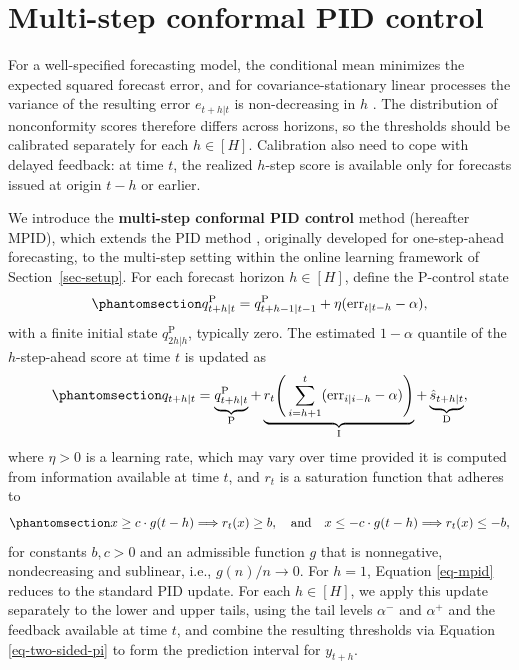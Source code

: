 \documentclass[
  american,
  12pt]{article}
\theoremstyle{plain}
\theoremstyle{plain}
\theoremstyle{remark}
\begin{document}
\section{Multi-step conformal PID control}\label{sec-mpid}

For a well-specified forecasting model, the conditional mean minimizes
the expected squared forecast error, and for covariance-stationary
linear processes the variance of the resulting error \(e_{t+h|t}\) is
non-decreasing in \(h\) \citep{diebold1996, patton2007}. The
distribution of nonconformity scores therefore differs across horizons,
so the thresholds should be calibrated separately for each \(h\in[H]\).
Calibration also need to cope with delayed feedback: at time \(t\), the
realized \(h\)-step score is available only for forecasts issued at
origin \(t-h\) or earlier.

We introduce the \textbf{multi-step conformal PID control} method
(hereafter MPID), which extends the PID method \citep{angelopoulos2024},
originally developed for one-step-ahead forecasting, to the multi-step
setting within the online learning framework of Section~\ref{sec-setup}.
For each forecast horizon \(h\in[H]\), define the P-control state
\begin{equation}\phantomsection\label{eq-p-state}{
q^{\mathrm P}_{t+h|t}=q^{\mathrm P}_{t+h-1|t-1}+\eta(\mathrm{err}_{t|t-h}-\alpha),
}\end{equation} with a finite initial state \(q^{\mathrm P}_{2h|h}\),
typically zero. The estimated \(1-\alpha\) quantile of the
\(h\)-step-ahead score at time \(t\) is updated as
\begin{equation}\phantomsection\label{eq-mpid}{
q_{t+h|t}=\underbrace{q^{\mathrm P}_{t+h|t}}_{\mathrm P}+\underbrace{r_t\Bigg(\sum_{i=h+1}^t(\mathrm{err}_{i|i-h}-\alpha)\Bigg)}_{\mathrm I}+\underbrace{\hat{s}_{t+h|t}}_{\mathrm D},
}\end{equation} where \(\eta > 0\) is a learning rate, which may vary
over time provided it is computed from information available at time
\(t\), and \(r_t\) is a saturation function that adheres to
\begin{equation}\phantomsection\label{eq-saturation_h}{
x \geq c \cdot g(t-h) \Longrightarrow r_t(x) \geq b, \quad \text {and} \quad x \leq-c \cdot g(t-h) \Longrightarrow r_t(x) \leq -b,
}\end{equation} for constants \(b, c > 0\) and an admissible function
\(g\) that is nonnegative, nondecreasing and sublinear, i.e.,
\(g(n)/n\to0\). For \(h=1\), Equation \eqref{eq-mpid} reduces to the
standard PID update. For each \(h\in[H]\), we apply this update
separately to the lower and upper tails, using the tail levels
\(\alpha^{-}\) and \(\alpha^{+}\) and the feedback available at time
\(t\), and combine the resulting thresholds via Equation
\eqref{eq-two-sided-pi} to form the prediction interval for \(y_{t+h}\).
\end{document}
